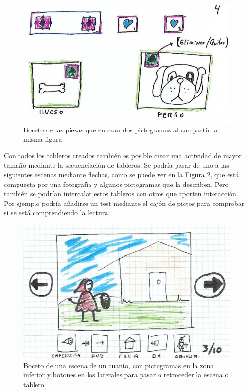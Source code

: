 \begin{itemize}
	\begin{figure}[h!]
		\centering
		\includegraphics[width=0.7\linewidth]{Imagenes/Bitmap/componenteEnla}
		\caption{Boceto de las piezas que enlazan dos pictogramas al compartir la misma figura}
		\label{fig:componenteenla}
	\end{figure}

	
\end{itemize}

Con todos los tableros creados también es posible crear una actividad de mayor tamaño mediante la secuenciación de tableros. Se podría pasar de uno a las siguientes escenas mediante flechas, como se puede ver en la Figura \ref{fig:cuento}, que está compuesta por una fotografía y algunos pictogramas que la describen. Pero también se podrían intercalar estos tableros con otros que aporten interacción. Por ejemplo podría añadirse un test mediante el cajón de pictos para comprobar si se está comprendiendo la lectura.

\begin{figure}[h!]
	\centering
	\includegraphics[width=0.7\linewidth]{Imagenes/Bitmap/Cuento}
	\caption{Boceto de una escena de un cuanto, con pictogramas en la zona inferior y botones en los laterales para pasar o retroceder la escena o tablero}
	\label{fig:cuento}
\end{figure}


